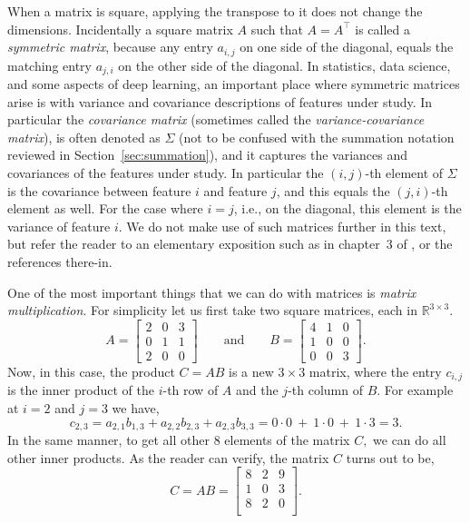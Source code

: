 \documentclass[12pt]{article}
\begin{document}
When a matrix is square, applying the transpose to it does not change the dimensions. Incidentally a square matrix $A$ such that $A = A^\top$ is called a {\em symmetric matrix}, because any entry $a_{i,j}$ on one side of the diagonal, equals the matching entry $a_{j,i}$ on the other side of the diagonal. In statistics, data science, and some aspects of deep learning, an important place where symmetric matrices arise is with variance and covariance descriptions of features under study. In particular the {\em covariance matrix} (sometimes called the {\em variance-covariance matrix}), is often denoted as $\Sigma$ (not to be confused with the summation notation reviewed in Section~\ref{sec:summation}), and it captures the variances and covariances of the features under study. In particular the $(i,j)$-th element of $\Sigma$ is the covariance between feature $i$ and feature $j$, and this equals the $(j,i)$-th element as well. For the case where $i=j$, i.e., on the diagonal, this element is the variance of feature $i$. We do not make use of such matrices further in this text, but refer the reader to an elementary exposition such as in chapter~3 of \cite{nazarathy2020statistics}, or the references there-in.

One of the most important things that we can do with matrices is {\em matrix multiplication}. For simplicity let us first take two square matrices, each in ${\mathbb R}^{3 \times 3}$.
%
\begin{equation}
\label{eq:matrix-a-b-for-mult}
A = 
\begin{bmatrix}
2 & 0 &3 \\
0 & 1 & 1 \\
2 & 0 & 0
\end{bmatrix}
\qquad
\text{and}
\qquad
B = 
\begin{bmatrix}
4 & 1 &0 \\
1 & 0 & 0 \\
0 & 0 & 3
\end{bmatrix}.
\end{equation}
%
Now, in this case, the product $C= AB$ is a new $3 \times 3$ matrix, where the entry $c_{i,j}$ is the inner product of the $i$-th row of $A$ and the $j$-th column of $B$. For example at $i=2$ and $j=3$ we have,
\[
c_{2,3} = a_{2,1} b_{1,3} + a_{2,2} b_{2,3} + a_{2,3} b_{3,3} = 0\cdot 0 ~+~ 1\cdot 0 ~+~ 1\cdot 3 = 3.
\]
%
In the same manner, to get all other $8$ elements of the matrix $C,$ we can do all other inner products. As the reader can verify, the matrix $C$ turns out to be,
%
\begin{equation}
\label{eq:matrix-example}
C = A B = \begin{bmatrix}
8 & 2 & 9 \\
1 & 0 & 3 \\
8 & 2 & 0 \\
\end{bmatrix}.
\end{equation}
%
\end{document}
